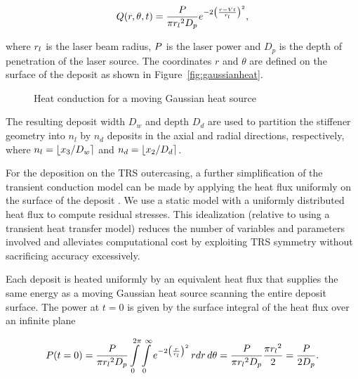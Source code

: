 \begin{equation}
	Q(r,\theta,t) = \dfrac{\color{black}{P}}{\pi{\color{black}{r_l}}^2 D_p}e^{-2\left(\frac{r-{\color{black}{V}}t}{\color{black}{r_l}}\right)^2}, \label{eg:gaussian}
\end{equation}

where ${\color{black}{r_l}}$ is the laser beam radius, ${\color{black}{P}}$ is the laser power and $D_p$ is the depth of penetration of the laser source. The coordinates $r$ and $\theta$ are defined on the surface of the deposit as shown in Figure~\ref{fig:gaussianheat}. 

\begin{figure}[h!]
	\centering
	 \hspace{0.1\textwidth}%
	\caption{Heat conduction for a moving Gaussian heat source}
	\label{fig:gaussian}
\end{figure}

The resulting deposit width $D_w$ and depth $D_d$ are used to partition the stiffener geometry into $n_l$ by $n_d$ deposits in the axial and radial directions, respectively, where $n_l = \lfloor x_3/D_w\rceil$ and $n_d = \lfloor x_2/D_d\rceil$. 

For the deposition on the \ac{TRS} outercasing, a further simplification of the transient conduction model can be made by applying the heat flux uniformly on the surface of the deposit \cite{Nickel2001}. We use a static model with a uniformly distributed heat flux to compute residual stresses. This idealization (relative to using a transient heat transfer model) reduces the number of variables and parameters involved and alleviates computational cost by exploiting TRS symmetry without sacrificing accuracy excessively.

Each deposit is heated uniformly by an equivalent heat flux that supplies the same energy as a moving Gaussian heat source scanning the entire deposit surface. The power at $t=0$ is given by the surface integral of the heat flux over an infinite plane

\begin{equation}
	\label{eq:power}
	P(t=0) = \dfrac{\color{black}{P}}{\pi{\color{black}{r_l}}^2 D_p} \int\limits_{0}^{2\pi} \int\limits_{0}^{\infty} e^{-2\left(\frac{r}{\color{black}{r_l}}\right)^2} \,rdr\,d\theta = \dfrac{\color{black}{P}}{\pi{\color{black}{r_l}}^2 D_p}\dfrac{\pi{\color{black}{r_l}}^2}{2} = \dfrac{\color{black}{P}}{2D_p}.
\end{equation}


